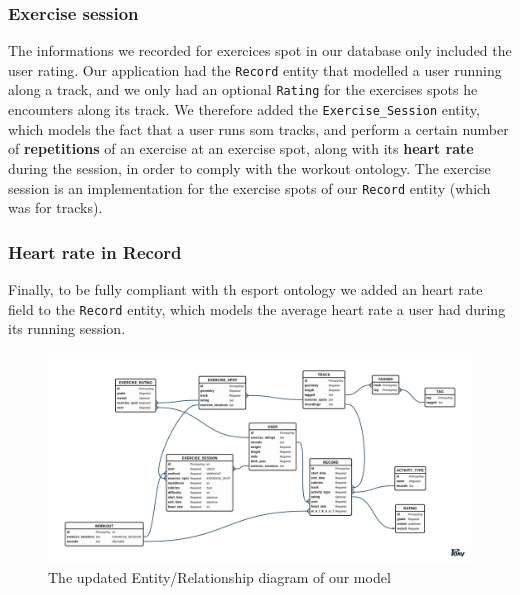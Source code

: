 \documentclass[a4paper]{article}
\begin{document}
\subsubsection{Exercise session}
The informations we recorded for exercices spot in our database only included the user rating. Our application had the \texttt{Record} entity that modelled a user running along a track, and we only had an optional \texttt{Rating} for the exercises spots he encounters along its track. We therefore added the \texttt{Exercise\_Session} entity, which models the fact that a user runs som tracks, and perform a certain number of \textbf{repetitions} of an exercise at an exercise spot, along with its \textbf{heart rate} during the session, in order to comply with the workout ontology. The exercise session is an implementation for the exercise spots of our \texttt{Record} entity (which was for tracks).

\subsubsection{Heart rate in Record}
Finally, to be fully compliant with th esport ontology we added an heart rate field to the \texttt{Record} entity, which models the average heart rate a user had during its running session.


\begin{figure}
  \center
  \includegraphics[width=\textwidth]{er.png}
  \caption{\label{fig:new-er} The updated Entity/Relationship diagram of our model}
\end{figure}
\end{document}

